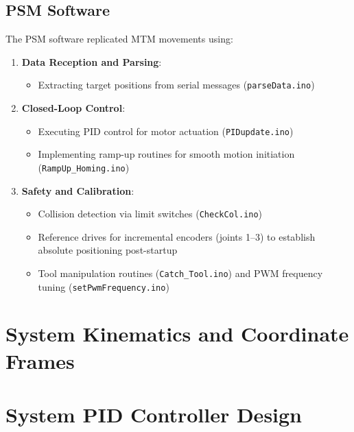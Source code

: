 \subsection{PSM Software}
The PSM software replicated MTM movements using:

\begin{enumerate}
    \item \textbf{Data Reception and Parsing}:
    \begin{itemize}
        \item Extracting target positions from serial messages (\texttt{parseData.ino})
    \end{itemize}
    
    \item \textbf{Closed-Loop Control}:
    \begin{itemize}
        \item Executing PID control for motor actuation (\texttt{PIDupdate.ino})
        \item Implementing ramp-up routines for smooth motion initiation (\texttt{RampUp\_Homing.ino})
    \end{itemize}
    
    \item \textbf{Safety and Calibration}:
    \begin{itemize}
        \item Collision detection via limit switches (\texttt{CheckCol.ino})
        \item Reference drives for incremental encoders (joints 1--3) to establish absolute positioning post-startup
        \item Tool manipulation routines (\texttt{Catch\_Tool.ino}) and PWM frequency tuning (\texttt{setPwmFrequency.ino})
    \end{itemize}
\end{enumerate}

\section{System Kinematics and Coordinate Frames}

\section{System PID Controller Design}


